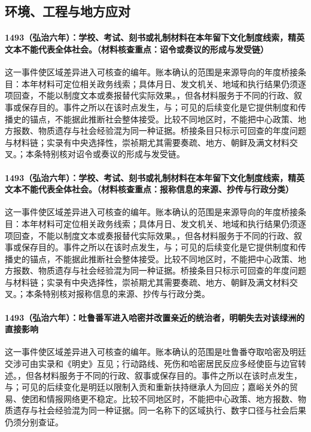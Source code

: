 \subsection{环境、工程与地方应对}

\paragraph{1493（弘治六年）：学校、考试、刻书或礼制材料在本年留下文化制度线索，精英文本不能代表全体社会。（材料核查重点：诏令或奏议的形成与发受链）} 这一事件使区域差异进入可核查的编年。账本确认的范围是来源导向的年度桥接条目：本年材料可定位相关政务线索；具体月日、发文机关、地域和执行结果仍须逐项回查，不能以制度文本或奏报替代实际效果。，但各材料服务于不同的行政、叙事或保存目的。事件之所以在该时点发生，与；可见的后续变化是它提供制度和传播史的锚点，不能据此推断社会整体接受。比较不同地区时，不能把中心政策、地方报数、物质遗存与社会经验混为同一种证据。桥接条目只标示可回查的年度问题与材料链；实录有中央选择性，崇祯期尤其需要奏疏、地方、朝鲜及满文材料交叉。；本条特别核对诏令或奏议的形成与发受链。

\paragraph{1493（弘治六年）：学校、考试、刻书或礼制材料在本年留下文化制度线索，精英文本不能代表全体社会。（材料核查重点：报称信息的来源、抄传与行政分类）} 这一事件使区域差异进入可核查的编年。账本确认的范围是来源导向的年度桥接条目：本年材料可定位相关政务线索；具体月日、发文机关、地域和执行结果仍须逐项回查，不能以制度文本或奏报替代实际效果。，但各材料服务于不同的行政、叙事或保存目的。事件之所以在该时点发生，与；可见的后续变化是它提供制度和传播史的锚点，不能据此推断社会整体接受。比较不同地区时，不能把中心政策、地方报数、物质遗存与社会经验混为同一种证据。桥接条目只标示可回查的年度问题与材料链；实录有中央选择性，崇祯期尤其需要奏疏、地方、朝鲜及满文材料交叉。；本条特别核对报称信息的来源、抄传与行政分类。

\paragraph{1493（弘治六年）：吐鲁番军进入哈密并改置亲近的统治者，明朝失去对该绿洲的直接影响} 这一事件使区域差异进入可核查的编年。账本确认的范围是吐鲁番夺取哈密及明廷交涉可由实录和《明史》互见；行动路线、死伤和哈密居民反应多经使臣与边官转述。，但各材料服务于不同的行政、叙事或保存目的。事件之所以在该时点发生，与；可见的后续变化是明廷以限制入贡和重新扶持继承人为回应；嘉峪关外的贸易、使团和情报网络更不稳定。比较不同地区时，不能把中心政策、地方报数、物质遗存与社会经验混为同一种证据。同一名称下的区域执行、数字口径与社会后果仍须分别查证。


